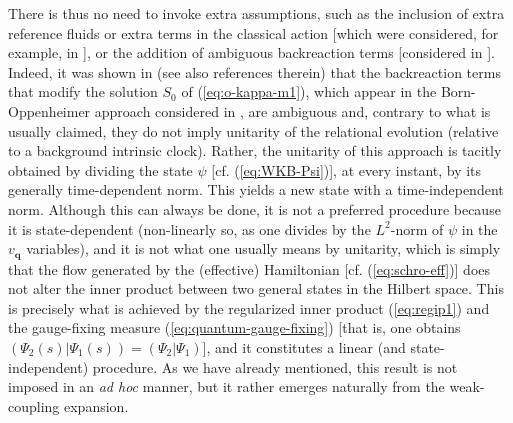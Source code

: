 \documentclass[12pt]{iopart}
\def\eref#1{(\ref{eq:#1})}
\def\q{\mathbf{q}}
\begin{document}
There is thus no need to invoke extra assumptions, such as the inclusion of extra reference fluids or extra terms in the classical action [which were considered, for example, in \citet{Maniccia:2023fkt}], or the addition of ambiguous backreaction terms [considered in \citet{KTV1,KTV2,KTV3}]. Indeed, it was shown in \citet{Chataignier:2019psm,Chataig:Thesis,Chataignier:2020fap} (see also references therein) that the backreaction terms that modify the solution $S_0$ of \eref{o-kappa-m1}, which appear in the Born-Oppenheimer approach considered in \citet{KTV1,KTV2,KTV3}, are ambiguous and, contrary to what is usually claimed, they do not imply unitarity of the relational evolution (relative to a background intrinsic clock). Rather, the unitarity of this approach is tacitly obtained by dividing the state $\psi$ [cf. \eref{WKB-Psi}], at every instant, by its generally time-dependent norm. This yields a new state with a time-independent norm. Although this can always be done, it is not a preferred procedure because it is state-dependent (non-linearly so, as one divides by the $L^2$-norm of $\psi$ in the $v_{\q}$ variables), and it is not what one usually means by unitarity, which is simply that the flow generated by the (effective) Hamiltonian [cf. \eref{schro-eff}] does not alter the inner product between two general states in the Hilbert space. This is precisely what is achieved by the regularized inner product \eref{regip1} and the gauge-fixing measure \eref{quantum-gauge-fixing} [that is, one obtains $(\Psi_2(s)|\Psi_1(s))=(\Psi_2|\Psi_1)$], and it constitutes a linear (and state-independent) procedure. As we have already mentioned, this result is not imposed in an \emph{ad hoc} manner, but it rather emerges naturally from the weak-coupling expansion.
\end{document}
